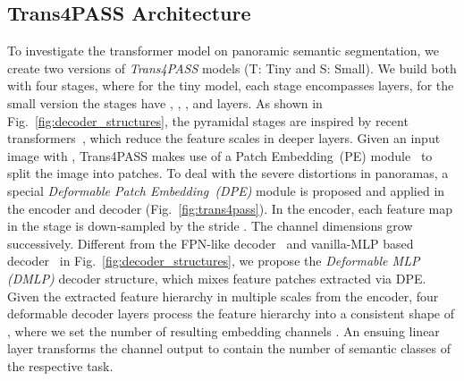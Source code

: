 \documentclass[final]{cvpr}
\begin{document}

\subsection{Trans4PASS Architecture}
\label{sec:trans4pass}
To investigate the transformer model on panoramic semantic segmentation, we create two versions of \emph{Trans4PASS} models (T: Tiny and S: Small). We build both with four stages, where for the tiny model, each stage encompasses  layers, for the small version the stages have , , , and  layers.
As shown in Fig.~\ref{fig:decoder_structures}, the pyramidal stages are inspired by recent transformers~\cite{pvt,segformer}, which reduce the feature scales in deeper layers. Given an input image with , Trans4PASS makes use of a Patch Embedding~(PE) module~\cite{segformer} to split the image into patches.
To deal with the severe distortions in panoramas, a special \emph{Deformable Patch Embedding~(DPE)} module is proposed and applied in the encoder and decoder (Fig.~\ref{fig:trans4pass}).
In the encoder, each feature map  in the  stage is down-sampled by the  stride . The channel dimensions  grow successively. 
Different from the FPN-like decoder~\cite{setr} and vanilla-MLP based decoder~\cite{segformer} in Fig.~\ref{fig:decoder_structures},
we propose the \emph{Deformable MLP (DMLP)} decoder structure, which mixes feature patches extracted via DPE.
Given the extracted feature hierarchy in multiple scales from the encoder, four deformable decoder layers process the feature hierarchy into a consistent shape of , where we set the number of resulting embedding channels .
An ensuing linear layer transforms the  channel output to contain the number of semantic classes of the respective task.
\end{document}
